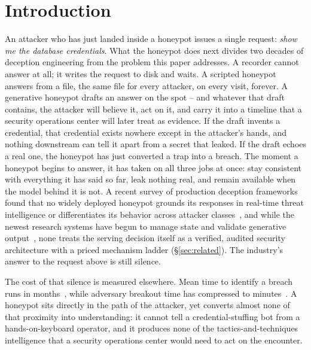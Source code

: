 \section{Introduction}
\label{sec:intro}

An attacker who has just landed inside a honeypot issues a single
request: \emph{show me the database credentials}. What the honeypot does
next divides two decades of deception engineering from the problem this
paper addresses. A recorder cannot answer at all; it writes the request
to disk and waits. A scripted honeypot answers from a file, the same file
for every attacker, on every visit, forever. A generative honeypot
drafts an answer on the spot -- and whatever that draft contains, the
attacker will believe it, act on it, and carry it into a timeline that a
security operations center will later treat as evidence. If the draft
invents a credential, that credential exists nowhere except in the
attacker's hands, and nothing downstream can tell it apart from a secret
that leaked. If the draft echoes a real one, the honeypot has just
converted a trap into a breach. The moment a honeypot begins to answer,
it has taken on all three jobs at once: stay consistent with everything
it has said so far, leak nothing real, and remain available when the
model behind it is not. A recent survey of production deception
frameworks found that no widely deployed honeypot grounds its responses
in real-time threat intelligence or differentiates its behavior across
attacker classes~\cite{lopez2024}, and while the newest research systems
have begun to manage state and validate generative
output~\cite{li2026llmsshh,laragutierrez2026genpot}, none treats the
serving decision itself as a verified, audited security architecture
with a priced mechanism ladder (\S\ref{sec:related}). The industry's
answer to the request
above is still silence.

The cost of that silence is measured elsewhere. Mean time to identify a
breach runs in
months~\cite{ibm2024}, while adversary breakout time has compressed to
minutes~\cite{crowdstrike2026}. A honeypot sits directly in the path of the
attacker, yet converts almost none of that proximity into understanding: it
cannot tell a credential-stuffing bot from a hands-on-keyboard operator,
and it produces none of the
tactics-and-techniques intelligence that a security operations center would
need to act on the encounter.

